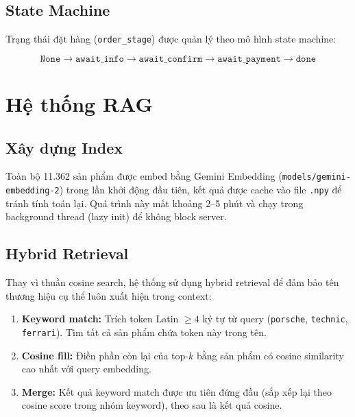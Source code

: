 \documentclass[12pt, a4paper]{report}
\begin{document}
\subsection{State Machine}

Trạng thái đặt hàng (\texttt{order\_stage}) được quản lý theo
mô hình state machine:

\begin{equation}
  \texttt{None} \rightarrow \texttt{await\_info} \rightarrow
  \texttt{await\_confirm} \rightarrow \texttt{await\_payment} \rightarrow
  \texttt{done}
\end{equation}

\section{Hệ thống RAG}

\subsection{Xây dựng Index}

Toàn bộ 11.362 sản phẩm được embed bằng Gemini Embedding
(\texttt{models/gemini-embedding-2}) trong lần khởi động đầu tiên,
kết quả được cache vào file \texttt{.npy} để tránh tính toán lại.
Quá trình này mất khoảng 2--5 phút và chạy trong background thread
(lazy init) để không block server.

\subsection{Hybrid Retrieval}

Thay vì thuần cosine search, hệ thống sử dụng hybrid retrieval
để đảm bảo tên thương hiệu cụ thể luôn xuất hiện trong context:

\begin{enumerate}
  \item \textbf{Keyword match:} Trích token Latin $\geq 4$ ký tự
        từ query (\texttt{porsche}, \texttt{technic}, \texttt{ferrari}).
        Tìm tất cả sản phẩm chứa token này trong tên.
  \item \textbf{Cosine fill:} Điền phần còn lại của top-$k$
        bằng sản phẩm có cosine similarity cao nhất với query embedding.
  \item \textbf{Merge:} Kết quả keyword match được ưu tiên đứng đầu
        (sắp xếp lại theo cosine score trong nhóm keyword),
        theo sau là kết quả cosine.
\end{enumerate}
\end{document}

